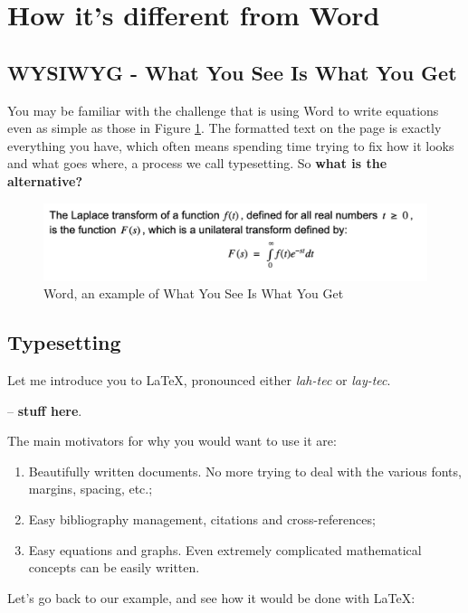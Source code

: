 \section{How it's different from Word}
\subsection{WYSIWYG - What You See Is What You Get}
You may be familiar with the challenge that is using Word to write equations even as simple as those in Figure \ref{fig:word}.
The formatted text on the page is exactly everything you have, which often means spending time trying to fix how it looks and what goes where, a process we call typesetting. So \textbf{what is the alternative?}

\begin{figure}
    \centering
    \includegraphics[scale=0.8]{figures/word.png}
    \caption{Word, an example of What You See Is What You Get}
    \label{fig:word}
\end{figure}

\pagebreak

\subsection{Typesetting}
Let me introduce you to \LaTeX, pronounced either \emph{lah-tec} or \emph{lay-tec}.

-- \textbf{stuff here}.

The main motivators for why you would want to use it are:
\begin{enumerate}
    \item Beautifully written documents. No more trying to deal with the various fonts, margins, spacing, etc.;
    \item Easy bibliography management, citations and cross-references;
    \item Easy equations and graphs. Even extremely complicated mathematical concepts can be easily written.
\end{enumerate}

Let's go back to our example, and see how it would be done with \LaTeX:


